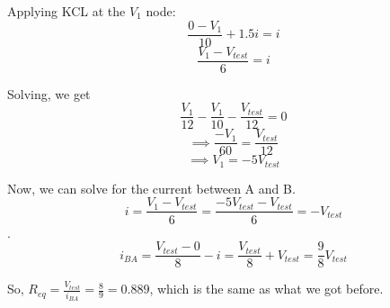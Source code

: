\begin{enumerate}
{Applying KCL at the $V_1$ node:
$$\frac{0 - V_1}{10} + 1.5i = i$$
$$\frac{V_1 - V_{test}}{6} = i$$

Solving, we get
$$\frac{V_1}{12} - \frac{V_1}{10} - \frac{V_{test}}{12} = 0$$
$$\implies \frac{-V_1}{60} = \frac{V_{test}}{12}$$
$$\implies V_1 = -5V_{test}$$

Now, we can solve for the current between A and B.
$$i = \frac{V_1 - V_{test}}{6} = \frac{-5V_{test} - V_{test}}{6} = -V_{test}$$.
$$i_{BA} = \frac{V_{test} - 0}{8} - i = \frac{V_{test}}{8} + V_{test}= \frac{9}{8}V_{test}$$

So, $R_{eq} = \frac{V_{test}}{i_{BA}} = \frac{8}{9} = 0.889$, which is the same as what we got before.
}



\end{enumerate}

